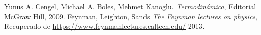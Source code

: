 \begin{thebibliography}{99}
    \bibitem{}
    Yunus A. Cengel,
    Michael A. Boles,
    Mehmet Kanoglu.
    \emph{Termodinámica},
    Editorial McGraw Hill,
    2009.
    \bibitem{}
    Feynman, Leighton, Sands
    \emph{The Feynman lectures on physics},
    Recuperado de \href{https://www.feynmanlectures.caltech.edu/}{https://www.feynmanlectures.caltech.edu/}
    2013.
\end{thebibliography}
